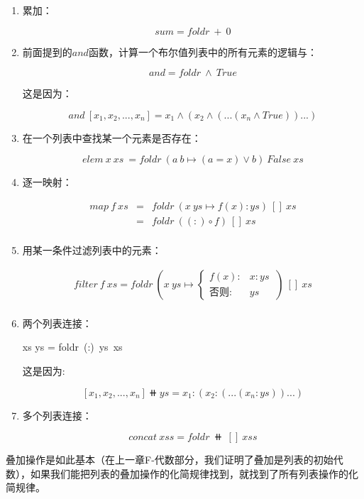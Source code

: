 \documentclass[b5paper]{ctexart}
\begin{document}
\begin{enumerate}
\item 累加：

\[
sum = foldr\ +\ 0
\]

\item 前面提到的$and$函数，计算一个布尔值列表中的所有元素的逻辑与：

\[
and = foldr\ \land\ True
\]

这是因为：

\[
and\ [x_1, x_2, ..., x_n] = x_1 \land (x_2 \land (...(x_n \land True))...)
\]

\item 在一个列表中查找某一个元素是否存在：

\[
elem\ x\ xs\ = foldr\ (a\ b \mapsto (a = x) \lor b)\ False\ xs
\]

\item 逐一映射：

\[
\begin{array}{rcl}
map\ f\ xs & = & foldr\ (x\ ys \mapsto f(x) : ys)\ []\ xs \\
           & = & foldr\ ((:) \circ f)\ []\ xs \\
\end{array}
\]

\item 用某一条件过滤列表中的元素：

\[
\begin{array}{rl}
filter\ f\ xs = foldr\ (x\ ys \mapsto
  \begin{cases}
    f(x): & x:ys\ \\
    \text{否则}: & ys
  \end{cases})\ []\ xs \\
\end{array}
\]

\item 两个列表连接：

\be
xs \doubleplus ys = foldr\ (:)\ ys\ xs
\label{eq:binary-concat}
\ee

这是因为:

\[
[x_1, x_2, ..., x_n] \doubleplus ys = x_1 : (x_2 : (...(x_n : ys))...)
\]

\item 多个列表连接：

\[
concat\ xss = foldr\ \doubleplus\ []\ xss
\]

\end{enumerate}

叠加操作是如此基本（在上一章F-代数部分，我们证明了叠加是列表的初始代数），如果我们能把列表的叠加操作的化简规律找到，就找到了所有列表操作的化简规律。
\end{document}
